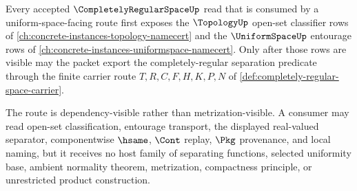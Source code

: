Every accepted $\CompletelyRegularSpaceUp$ read that is consumed by a uniform-space-facing route first exposes the $\TopologyUp$ open-set classifier rows of \autoref{ch:concrete-instances-topology-namecert} and the $\UniformSpaceUp$ entourage rows of \autoref{ch:concrete-instances-uniformspace-namecert}. Only after those rows are visible may the packet export the completely-regular separation predicate through the finite carrier route $T,R,C,F,H,K,P,N$ of \autoref{def:completely-regular-space-carrier}.

The route is dependency-visible rather than metrization-visible. A consumer may read open-set classification, entourage transport, the displayed real-valued separator, componentwise $\hsame$, $\Cont$ replay, $\Pkg$ provenance, and local naming, but it receives no host family of separating functions, selected uniformity base, ambient normality theorem, metrization, compactness principle, or unrestricted product construction.
